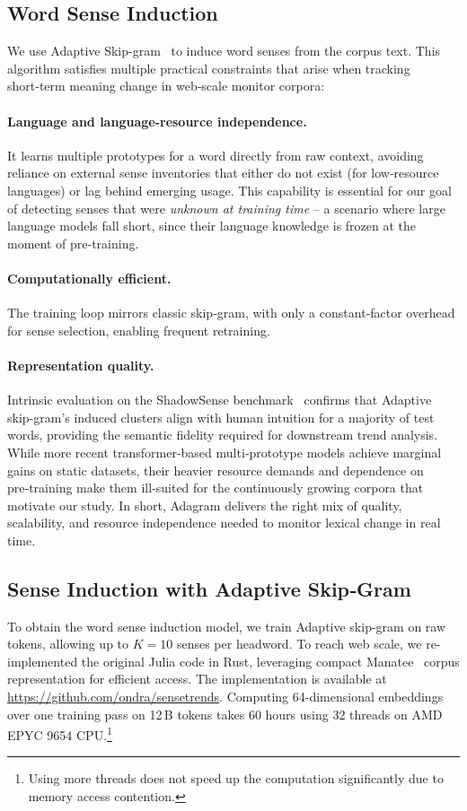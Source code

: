 \documentclass[11pt]{article}
\begin{document}
\subsection{Word Sense Induction}
We use Adaptive Skip-gram~\citep{adagram} to induce word senses from the corpus text. This algorithm satisfies multiple practical constraints that arise when tracking short‑term meaning change in web‑scale monitor corpora:

\paragraph{Language and language-resource independence.} It learns multiple prototypes for a word directly from raw context, avoiding reliance on external sense inventories that either do not exist (for low‑resource languages) or lag behind emerging usage. This capability is essential for our goal of detecting senses that were \emph{unknown at training time} -- a scenario where large language models fall short, since their language knowledge is frozen at the moment of pre‑training.

\paragraph{Computationally efficient.} The training loop mirrors classic skip‑gram, with only a constant‑factor overhead for sense selection, enabling frequent retraining.

\paragraph{Representation quality.} Intrinsic evaluation on the ShadowSense benchmark~\citep{herman2024shadowsense} confirms that Adaptive skip-gram’s induced clusters align with human intuition for a majority of test words, providing the semantic fidelity required for downstream trend analysis.  While more recent transformer‑based multi‑prototype models achieve marginal gains on static datasets, their heavier resource demands and dependence on pre‑training make them ill‑suited for the continuously growing corpora that motivate our study. In short, Adagram delivers the right mix of quality, scalability, and resource independence needed to monitor lexical change in real time.

\subsection{Sense Induction with Adaptive Skip‑Gram}
\label{sec:sense}
To obtain the word sense induction model, we train Adaptive skip-gram on raw tokens, allowing up to $K{=}10$ senses per headword. To reach web scale, we re-implemented the original Julia code in Rust, leveraging compact Manatee~\citep{rychly2007manatee}
corpus representation for efficient access. The implementation is available at \url{https://github.com/ondra/sensetrends}.
Computing 64-dimensional embeddings over one training pass on 12\,B tokens
takes 60 hours using 32 threads on AMD EPYC 9654 CPU.\footnote{Using more threads does not speed up the computation significantly due to memory access contention.}
\end{document}
